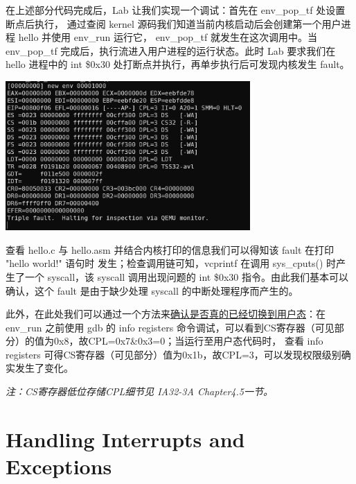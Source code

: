 \documentclass[12pt, letterpaper]{report}
\begin{document}
\newpage
在上述部分代码完成后，Lab 让我们实现一个调试：首先在 env\_pop\_tf 处设置断点后执行，
通过查阅 kernel 源码我们知道当前内核启动后会创建第一个用户进程 hello 并使用 env\_run 运行它，
env\_pop\_tf 就发生在这次调用中。当 env\_pop\_tf 完成后，执行流进入用户进程的运行状态。此时 
Lab 要求我们在 hello 进程中的 int \$0x30 处打断点并执行，再单步执行后可发现内核发生 fault。\par
\quad \par 
{
\centering
\includegraphics[width=0.7\textwidth]{hellofault} \par
}
\quad \par 
查看 hello.c 与 hello.asm 并结合内核打印的信息我们可以得知该 fault 在打印 "hello world!" 语句时
发生；检查调用链可知，vcprintf 在调用 sys\_cputs() 时产生了一个 syscall，该 syscall 调用出现问题的 
int \$0x30 指令。由此我们基本可以确认，这个 fault 是由于缺少处理 syscall 的中断处理程序而产生的。\par
此外，在此处我们可以通过一个方法来\underline{确认是否真的已经切换到用户态}：在 env\_run 之前使用 gdb 的
info registers 命令调试，可以看到CS寄存器（可见部分）的值为0x8，故CPL=0x7\&0x3=0；当运行至用户态代码时，
查看 info registers 可得CS寄存器（可见部分）值为0x1b，故CPL=3，可以发现权限级别确实发生了变化。\par
\textsl{注：CS寄存器低位存储CPL细节见 IA32-3A Chapter4.5一节。} 

\newpage
\section[\large Handling Interrupts and Exceptions]{Handling Interrupts and Exceptions}

\end{document}
